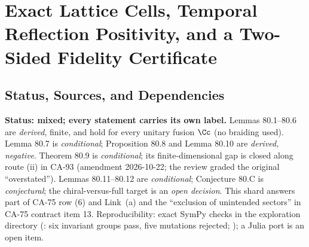 
\section{Exact Lattice Cells, Temporal Reflection Positivity, and a Two-Sided Fidelity Certificate}
\label{sec:lattice-sewing-fidelity-certificate}

\subsection{Status, Sources, and Dependencies}

\textbf{Status: mixed; every statement carries its own label.}  Lemmas 80.1--80.6 are \emph{derived},
finite, and hold for every unitary fusion \(\Cc\) (no braiding used).  Lemma 80.7 is \emph{conditional};
Proposition 80.8 and Lemma 80.10 are \emph{derived, negative}.  Theorem 80.9 is \emph{conditional}; its
finite-dimensional gap is closed along route (ii) in CA-93 (amendment 2026-10-22; the review graded the original
``overstated'').  Lemmas 80.11--80.12 are \emph{conditional}; Conjecture 80.C is \emph{conjectural}; the
chiral-versus-full target is an \emph{open decision}.  This shard answers part of CA-75 row (6) and Link~(a)
and the ``exclusion of unintended sectors'' in CA-75 contract item 13.  Reproducibility: exact SymPy checks
in the exploration directory (: six invariant groups pass, five mutations
rejected; ); a Julia port is an open item.

